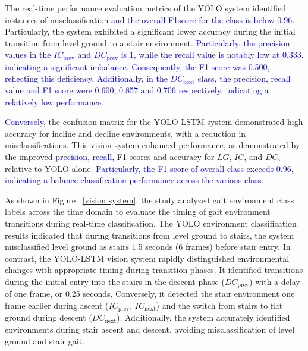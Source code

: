 \documentclass[journal,article,submit,pdftex,moreauthors]{Definitions/mdpi}
\begin{document}
The real-time performance evaluation metrics of the YOLO system identified instances of misclassification \textcolor{blue}{ and the overall F1score for the class is below 0.96}. Particularly, the system exhibited a significant lower accuracy during the initial transition from level ground to a stair environment. \textcolor{blue}{Particularly, the precision values in the $IC_{\text{prev}}$ and $DC_{\text{prev}}$ is 1, while the recall value is notably low at 0.333. indicating a significant imbalance. Consequently, the F1 score was 0.500, reflecting this deficiency. Additionally, in the $DC_{\text{next}}$ class, the precision, recall value and F1 score were 0.600, 0.857 and 0.706 respectively, indicating a relatively low performance.}

\textcolor{blue}{Conversely}, the confusion matrix for the YOLO-LSTM system demonstrated high accuracy for incline and decline environments, with a reduction in misclassifications. This vision system enhanced performance, as demonstrated by the improved \textcolor{blue}{precision, recall,} F1 scores and accuracy for $LG$, $IC$, and $DC$, relative to YOLO alone. \textcolor{blue}{Particularly, the F1 score of overall class exceeds 0.96, indicating a balance classification performance across the various class.}

As shown in Figure ~\ref{vision system}, the study analyzed gait environment class labels across the time domain to evaluate the timing of gait environment transitions during real-time classification. The YOLO environment classification results indicated that during transitions from level ground to stairs, the system misclassified level ground as stairs 1.5 seconds (6 frames) before stair entry.
In contrast, the YOLO-LSTM vision system rapidly distinguished environmental changes with appropriate timing during transition phases. It identified transitions during the initial entry into the stairs in the descent phase ($DC_{\text{prev}}$) with a delay of one frame, or 0.25 seconds. Conversely, it detected the stair environment one frame earlier during ascent ($IC_{\text{prev}}$, $IC_{\text{next}}$) and the switch from stairs to flat ground during descent ($DC_{\text{next}}$).
Additionally, the system accurately identified environments during stair ascent and descent, avoiding misclassification of level ground and stair gait. %
\end{document}
